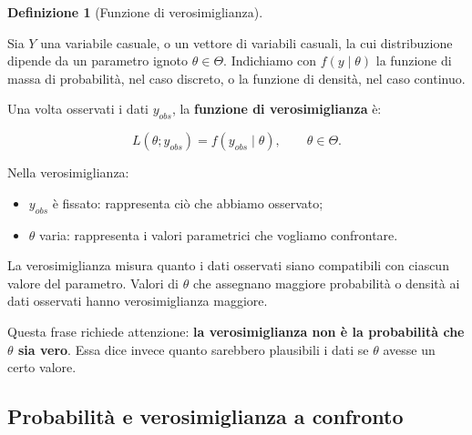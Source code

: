 \documentclass[
  italian,
  letterpaper,
  a4paper,
  11pt,
  open=any]{scrbook}
\providecommand{\tightlist}{%
  \setlength{\itemsep}{0pt}\setlength{\parskip}{0pt}}
\theoremstyle{plain}
\theoremstyle{definition}
\theoremstyle{definition}
\newtheorem{definition}{Definizione}[chapter]
\theoremstyle{remark}
\begin{document}
\begin{definition}[Funzione di
verosimiglianza]\protect\hypertarget{def-likelihood}{}\label{def-likelihood}

Sia \(Y\) una variabile casuale, o un vettore di variabili casuali, la
cui distribuzione dipende da un parametro ignoto \(\theta \in \Theta\).
Indichiamo con \(f(y \mid \theta)\) la funzione di massa di probabilità,
nel caso discreto, o la funzione di densità, nel caso continuo.

Una volta osservati i dati \(y_{obs}\), la \textbf{funzione di
verosimiglianza} è:

\[
L(\theta; y_{obs}) = f(y_{obs} \mid \theta), \qquad \theta \in \Theta.
\]

Nella verosimiglianza:

\begin{itemize}
\tightlist
\item
  \(y_{obs}\) è fissato: rappresenta ciò che abbiamo osservato;
\item
  \(\theta\) varia: rappresenta i valori parametrici che vogliamo
  confrontare.
\end{itemize}

\end{definition}

La verosimiglianza misura quanto i dati osservati siano compatibili con
ciascun valore del parametro. Valori di \(\theta\) che assegnano
maggiore probabilità o densità ai dati osservati hanno verosimiglianza
maggiore.

Questa frase richiede attenzione: \textbf{la verosimiglianza non è la
probabilità che \(\theta\) sia vero}. Essa dice invece quanto sarebbero
plausibili i dati se \(\theta\) avesse un certo valore.

\subsection{Probabilità e verosimiglianza a
confronto}\label{probabilituxe0-e-verosimiglianza-a-confronto}
\end{document}
